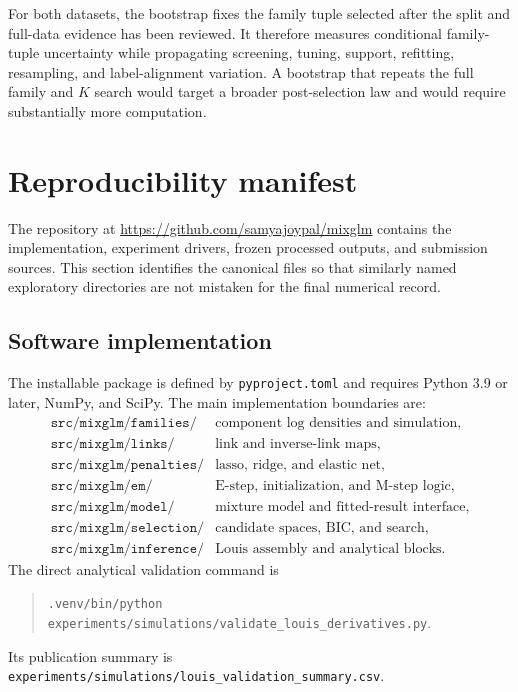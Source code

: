 \documentclass[a4paper,fleqn]{cas-sc}
\numberwithin{equation}{section}
\begin{document}
For both datasets, the bootstrap fixes the family tuple selected after the split and full-data evidence has been reviewed. It therefore measures conditional family-tuple uncertainty while propagating screening, tuning, support, refitting, resampling, and label-alignment variation. A bootstrap that repeats the full family and $K$ search would target a broader post-selection law and would require substantially more computation.

\section{Reproducibility manifest}
\label{supp:reproducibility}

The repository at \url{https://github.com/samyajoypal/mixglm} contains the implementation, experiment drivers, frozen processed outputs, and submission sources. This section identifies the canonical files so that similarly named exploratory directories are not mistaken for the final numerical record.

\subsection{Software implementation}

The installable package is defined by \texttt{pyproject.toml} and requires Python 3.9 or later, NumPy, and SciPy. The main implementation boundaries are:
\[
\begin{array}{ll}
\texttt{src/mixglm/families/} & \text{component log densities and simulation},\\
\texttt{src/mixglm/links/} & \text{link and inverse-link maps},\\
\texttt{src/mixglm/penalties/} & \text{lasso, ridge, and elastic net},\\
\texttt{src/mixglm/em/} & \text{E-step, initialization, and M-step logic},\\
\texttt{src/mixglm/model/} & \text{mixture model and fitted-result interface},\\
\texttt{src/mixglm/selection/} & \text{candidate spaces, BIC, and search},\\
\texttt{src/mixglm/inference/} & \text{Louis assembly and analytical blocks}.
\end{array}
\]
The direct analytical validation command is
\begin{quote}
\small\texttt{.venv/bin/python experiments/simulations/validate\_louis\_derivatives.py}.
\end{quote}
Its publication summary is \texttt{experiments/simulations/louis\_validation\_summary.csv}.
\end{document}
